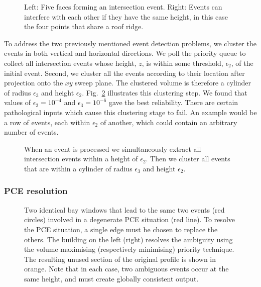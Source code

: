 \begin{figure}
  \centering
  \def\svgwidth{0.8\columnwidth}
  
  \caption[Architectural footprints often lead to degenerate events]{Left: Five faces forming an intersection event. Right: Events can interfere with each other if they have the same height, in this case the four points that share a roof ridge.}
\label{fig:RobustEventDetection}
\end{figure}

To address the two previously mentioned event detection problems, we cluster the events in both vertical and horizontal directions. We poll the priority queue to collect all intersection events whose height, $z$, is within some threshold, $\epsilon_2$, of the initial event. Second, we cluster all the events according to their location after projection onto the $xy$ sweep plane. The clustered volume is therefore a cylinder of radius $\epsilon_3$ and height $\epsilon_2$. Fig.~\ref{fig:clustering} illustrates this clustering step. We found that values of $\epsilon _2 = 10^{-4}$ and $\epsilon _3 = 10^{-6}$ gave the best reliability. There are certain pathological inputs which cause this clustering stage to fail. An example would be a row of events, each within $\epsilon_2$ of another, which could contain an arbitrary number of events.

\begin{figure}
  \centering
  \def\svgwidth{0.6\columnwidth}
  
  \caption[Epsilon error parameters]{\label{fig:clustering}
  When an event is processed we simultaneously extract all intersection events within a height of $\epsilon_2$. Then we cluster all events that are within a cylinder of radius $\epsilon_3$ and height $\epsilon_2$.}
\end{figure}

\subsubsection{PCE resolution}

\begin{figure}
  \centering
  \def\svgwidth{0.8\columnwidth}
  
  \caption[PE ambiguities]{\label{fig:ambig_demo}
Two identical bay windows that lead to the same two events (red circles) involved in a degenerate PCE situation (red line). 
To resolve the PCE situation, a single edge must be chosen to replace the others. The building on the left (right) resolves the ambiguity using the volume maximising (respectively minimising) priority technique. The resulting unused section of the original profile is shown in orange. Note that in each case, two ambiguous events occur at the same height, and must create globally consistent output.}
\end{figure}

